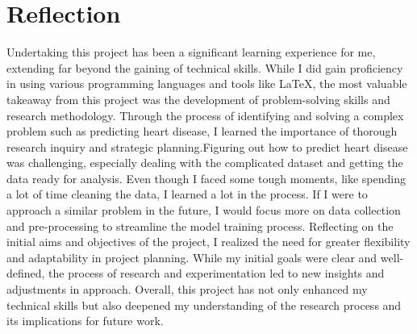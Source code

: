 \chapter{Reflection}

Undertaking this project has been a significant learning experience for me, extending far beyond the gaining of technical skills. While I did gain proficiency in using various programming languages and tools like LaTeX, the most valuable takeaway from this project was the development of problem-solving skills and research methodology. Through the process of identifying and solving a complex problem such as predicting heart disease, I learned the importance of thorough research inquiry and strategic planning.Figuring out how to predict heart disease was challenging, especially dealing with the complicated dataset and getting the data ready for analysis. Even though I faced some tough moments, like spending a lot of time cleaning the data, I learned a lot in the process. If I were to approach a similar problem in the future, I would focus more on data collection and pre-processing to streamline the model training process. Reflecting on the initial aims and objectives of the project, I realized the need for greater flexibility and adaptability in project planning. While my initial goals were clear and well-defined, the process of research and experimentation led to new insights and adjustments in approach. Overall, this project has not only enhanced my technical skills but also deepened my understanding of the research process and its implications for future work.
